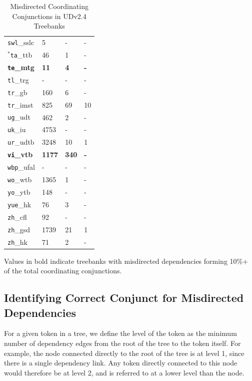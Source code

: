 \begin{table}[H]
{\begin{tabular}{|l|l|l|l|}
\texttt{swl}\_sslc & 5 & - & -\\
\(^{*}\)\texttt{ta}\_ttb & 46 & 1 & -\\
\textbf{\texttt{te}\_mtg} & \textbf{11} & \textbf{4} & \textbf{-}\\
\texttt{tl}\_trg & - & - & -\\
\texttt{tr}\_gb & 160 & 6 & -\\
\texttt{tr}\_imst & 825 & 69 & 10\\
\texttt{ug}\_udt & 462 & 2 & -\\
\texttt{uk}\_iu & 4753 & - & -\\
\texttt{ur}\_udtb & 3248 & 10 & 1\\
\textbf{\texttt{vi}\_vtb} & \textbf{1177} & \textbf{340} & \textbf{-}\\
\texttt{wbp}\_ufal & - & - & -\\
\texttt{wo}\_wtb & 1365 & 1 & -\\
\texttt{yo}\_ytb & 148 & - & -\\
\texttt{yue}\_hk & 76 & 3 & -\\
\texttt{zh}\_cfl & 92 & - & -\\
\texttt{zh}\_gsd & 1739 & 21 & 1\\
\texttt{zh}\_hk & 71 & 2 & -\\
\hline
\end{tabular}
}
\caption{Misdirected Coordinating Conjunctions in UDv2.4 Treebanks}
Values in bold indicate treebanks with misdirected dependencies forming 10\%+ of the total coordinating conjunctions.
\label{tab:conjunctions_all}
\end{table}


\subsection{Identifying Correct Conjunct for Misdirected Dependencies}
\label{ssec:conjunct-search}

For a given token in a tree, we define the level of the token as the minimum number of dependency edges from the root of the tree to the token itself. For example, the node connected directly to the root of the tree is at level 1, since there is a single dependency link. Any token directly connected to this node would therefore be at level 2, and is referred to at a lower level than the node.


